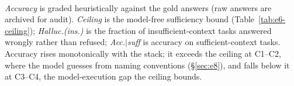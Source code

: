 \begin{table}[t]
\centering
\caption{E11: real-model sanity check. Model \texttt{gpt-5.6-sol}, 3 repeats, 35 tasks per condition, accessed 2026-10-06. A dated measurement; unlike every other table it is not regenerated by the deterministic pipeline.}
\label{tab:e11-realmodel}
\footnotesize
{}
\\[4pt]\begin{minipage}{\linewidth}\footnotesize \emph{Accuracy} is graded heuristically against the gold answers (raw answers are archived for audit). \emph{Ceiling} is the model-free sufficiency bound (Table~\ref{tab:e6-ceiling}); \emph{Halluc.(ins.)} is the fraction of insufficient-context tasks answered wrongly rather than refused; \emph{Acc.$|$suff} is accuracy on sufficient-context tasks. Accuracy rises monotonically with the stack; it exceeds the ceiling at C1--C2, where the model guesses from naming conventions (\S\ref{sec:e8}), and falls below it at C3--C4, the model-execution gap the ceiling bounds.\end{minipage}
\end{table}
